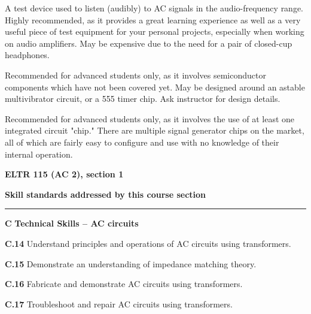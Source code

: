 \vskip 10pt

\noindent
{} A test device used to listen (audibly) to AC signals in the audio-frequency range.  Highly recommended, as it provides a great learning experience as well as a very useful piece of test equipment for your personal projects, especially when working on audio amplifiers.  May be expensive due to the need for a pair of closed-cup headphones.

\vskip 10pt

\noindent
{} Recommended for advanced students only, as it involves semiconductor components which have not been covered yet.  May be designed around an astable multivibrator circuit, or a 555 timer chip.  Ask instructor for design details.

\vskip 10pt

\noindent
{} Recommended for advanced students only, as it involves the use of at least one integrated circuit "chip."  There are multiple signal generator chips on the market, all of which are fairly easy to configure and use with no knowledge of their internal operation.

\vskip 10pt






\vfil \eject

\centerline{\bf ELTR 115 (AC 2), section 1} \bigskip 
 
\vskip 10pt

\noindent
{\bf Skill standards addressed by this course section}

\vskip 5pt

\hrule \vskip 10pt
\noindent
{}

\vskip 5pt

\medskip
\item{\bf C} {\bf Technical Skills -- AC circuits}
\item{\bf C.14} Understand principles and operations of AC circuits using transformers.
\item{\bf C.15} Demonstrate an understanding of impedance matching theory.
\item{\bf C.16} Fabricate and demonstrate AC circuits using transformers.
\item{\bf C.17} Troubleshoot and repair AC circuits using transformers.
\medskip

